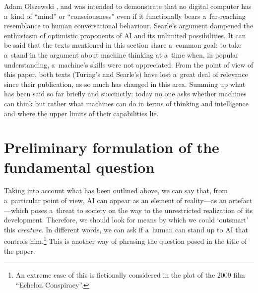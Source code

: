 \begin{artengenv}{Adam Olszewski}
\parencite*[][]{searle_minds_1980}, %
 and was intended to demonstrate that no digital computer has a~kind of ``mind'' or ``consciousness'' even if it functionally bears a~far-reaching resemblance to human conversational behaviour. Searle's argument dampened the enthusiasm of optimistic proponents of AI and its unlimited possibilities. It can be said that the texts mentioned in this section share a~common goal: to take a~stand in the argument about machine thinking at a~time when, in popular understanding, a~machine's skills were not appreciated. From the point of view of this paper, both texts (Turing's and Searle's) have lost a~great deal of relevance since their publication, as so much has changed in this area. Summing up what has been said so far briefly and succinctly: today no one asks whether machines can think but rather what machines can do in terms of thinking and intelligence and where the upper limits of their capabilities lie.

\section{Preliminary formulation of the fundamental question}
Taking into account what has been outlined above, we can say that, from a~particular point of view, AI can appear as an element of reality—as an artefact—which poses a~threat to society on the way to the unrestricted realization of its development. Therefore, we should look for means by which we could ‘outsmart' this \textit{creature}. In different words, we can ask if a~human can stand up to AI that controls him.\footnote{An extreme case of this is fictionally considered in the plot of the 2009 film ``Echelon Conspiracy''.} This is another way of phrasing the question posed in the title of the paper.


\end{artengenv}

